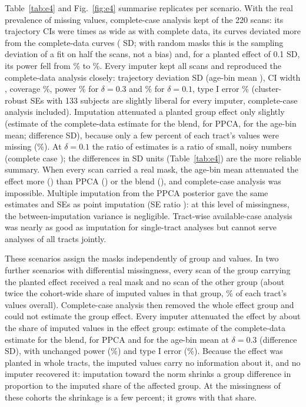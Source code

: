 \documentclass[11pt]{article}
\begin{document}
Table~\ref{tab:e4} and Fig.~\ref{fig:e4} summarise \efMainReps{} replicates per scenario. With the real prevalence of
missing values, complete-case analysis kept \efMainCcN{} of the 220 scans: its trajectory CIs were \efMainCcCi{} times as
wide as with complete data, its curves deviated more from the complete-data curves (\efMainCcBias{} SD; with random
masks this is the sampling deviation of a fit on half the scans, not a bias) and, for a
planted effect of 0.1 SD, its power fell from \efSmallFullPower\% to \efSmallCcPower\%. Every imputer kept all scans and
reproduced the complete-data analysis closely: trajectory deviation \efMainBlendBias{} SD (age-bin mean \efMainMeanBias),
CI width \efMainBlendCi{}, coverage \efMainBlendCoverage\%, power \efMainBlendPower\% for $\delta = 0.3$ and
\efSmallBlendPower\% for $\delta = 0.1$, type I error \efMainBlendTypei\% (cluster-robust SEs with 133 subjects are slightly liberal for every
imputer, complete-case analysis included).
Imputation attenuated a planted group effect only slightly (estimate \efMainBlendRelfull{} of the complete-data estimate
for the blend, \efMainPpcaRelfull{} for PPCA, \efMainMeanRelfull{} for the age-bin mean; difference \efMainBlendDiffsd{} SD),
because only a few percent of each tract's values were missing (\efMainMissShare\%). At $\delta = 0.1$ the ratio of
estimates is a ratio of small, noisy numbers (complete case \efSmallCcRelfull); the differences in SD units
(Table~\ref{tab:e4}) are the more reliable summary. When every scan carried a real mask, the age-bin mean attenuated the effect more
(\efSmallMissMeanRelfull) than PPCA (\efSmallMissPpcaRelfull) or the blend (\efSmallMissBlendRelfull), and complete-case
analysis was impossible. Multiple imputation from the PPCA posterior gave the same estimates and SEs as point imputation
(SE ratio \efMainMiSeratio): at this level of missingness, the between-imputation variance is negligible. Tract-wise
available-case analysis was nearly as good as imputation for single-tract analyses but cannot serve analyses of all
tracts jointly.

These scenarios assign the masks independently of group and values. In two further scenarios with differential
missingness, every scan of the group carrying the planted effect received a real mask and no scan of the other group
(about twice the cohort-wide share of imputed values in that group, \efDiffMissShare\% of each tract's values overall).
Complete-case analysis then removed the whole effect group and could not estimate the group effect. Every imputer
attenuated the effect by about the share of imputed values in the effect group: estimate \efDiffBlendRelfull{} of the
complete-data estimate for the blend, \efDiffPpcaRelfull{} for PPCA and \efDiffMeanRelfull{} for the age-bin mean at
$\delta = 0.3$ (difference \efDiffBlendDiffsd{} SD), with unchanged power (\efDiffBlendPower\%) and type I error
(\efDiffBlendTypei\%). Because the effect was planted in whole tracts, the imputed values carry no information about it,
and no imputer recovered it: imputation toward the norm shrinks a group difference in proportion to the imputed share of
the affected group. At the missingness of these cohorts the shrinkage is a few percent; it grows with that share.
\end{document}
